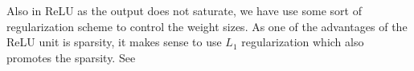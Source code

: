 \documentclass[a4paper, 11pt, fleqn]{article}
\begin{document}
Also in ReLU as the output does not saturate, we have use some sort of regularization scheme to control the weight sizes. As one of the advantages of the ReLU unit is sparsity, it makes sense to use $L_1$ regularization which also promotes the sparsity. See \cite{pmlr-v15-glorot11a}



\end{document}
